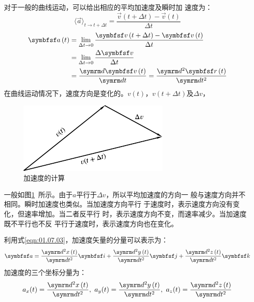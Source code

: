 对于一般的曲线运动，可以给出相应的平均加速度及瞬时加
速度为：
\begin{equation}\label{eqn:01.08.02}
  \langle \vec{a} \rangle_{t \rightarrow t+\Delta t} = \frac{\vec{v}\left(t+\Delta t\right)-\vec{v}\left(t\right)}{\Delta t}
\end{equation}
\begin{equation}\label{eqn:01.08.03}
  \begin{aligned}
    \vec{a}\left(t\right) & =\lim _{\Delta t \rightarrow 0} \frac{\vec{v}\left(t+\Delta t\right)-\vec{v}\left(t\right)}{\Delta t} \\
                          & =\lim_{\Delta t \rightarrow 0}\frac{\Delta \vec{v}}{\Delta t}                                         \\
                          & =\frac{\dif\vec{v}\left(t\right)}{\dif t}=\frac{\dif^2 \vec{r}\left(t\right)}{\dif t^2}
  \end{aligned}
\end{equation}
在曲线运动情况下，速度方向是变化的。$v\left(t\right)$，$v\left(t+\Delta t\right)$及$\Delta v$，
\begin{figure}
  \centering
  \small
  \includegraphics{figure/fig01.14}
  \caption{加速度的计算}
  \label{fig:01.14}
\end{figure}
一般如图\ref{fig:01.14}~所示。由于$a$平行于$\Delta v$，所以平均加速度的方向一
般与速度方向并不相同。瞬时加速度也类似。当加速度方向平行
于速度时，表示速度方向没有变化，但速率增加。当二者反平行
\clearpage\noindent
时，表示速度方向不变，而速率减少。当加速度既不平行也不反
平行于速度时，表示速度方向也在变化。

利用式\eqref{eqn:01.07.03}，加速度矢量的分量可以表示为：
\begin{equation}\label{eqn:01.08.04}
  \vec{a}=\frac{\dif^2x\left(t\right)}{\dif t^2}\vec{i}+\frac{\dif^2y\left(t\right)}{\dif t^2}\vec{j}+\frac{\dif^2z\left(t\right)}{\dif t^2}\vec{k}
\end{equation}
加速度的三个坐标分量为：
\setlength{\mathindent}{4em}
\begin{equation}\label{eqn:01.08.05}
  a_x(t)=\frac{\dif^2x\left(t\right)}{\dif t^2},~ a_y(t)=\frac{\dif^2y\left(t\right)}{\dif t^2},~
  a_z(t)=\frac{\dif^2z\left(t\right)}{\dif t^2}
\end{equation}
\setlength{\mathindent}{6em}

